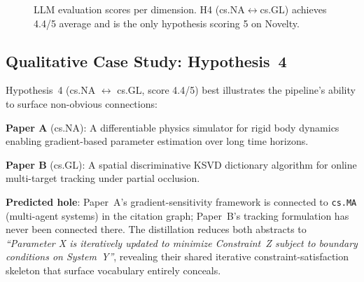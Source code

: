 \documentclass[11pt]{article}
\begin{document}
\begin{figure}[h]
\centering
{}
\caption{LLM evaluation scores per dimension. H4 (cs.NA$\leftrightarrow$cs.GL)
achieves 4.4/5 average and is the only hypothesis scoring 5 on Novelty.}
\label{fig:radar}
\end{figure}

\subsection{Qualitative Case Study: Hypothesis~4}

Hypothesis~4 (cs.NA $\leftrightarrow$ cs.GL, score 4.4/5) best illustrates
the pipeline's ability to surface non-obvious connections:

\noindent\textbf{Paper A} (cs.NA): A differentiable physics simulator for
rigid body dynamics enabling gradient-based parameter estimation over long
time horizons.

\noindent\textbf{Paper B} (cs.GL): A spatial discriminative KSVD dictionary
algorithm for online multi-target tracking under partial occlusion.

\noindent\textbf{Predicted hole}: Paper~A's gradient-sensitivity framework
is connected to \texttt{cs.MA} (multi-agent systems) in the citation graph;
Paper~B's tracking formulation has never been connected there.
The distillation reduces both abstracts to \textit{``Parameter X is
iteratively updated to minimize Constraint~Z subject to boundary
conditions on System~Y''}, revealing their shared iterative
constraint-satisfaction skeleton that surface vocabulary entirely conceals.
\end{document}
